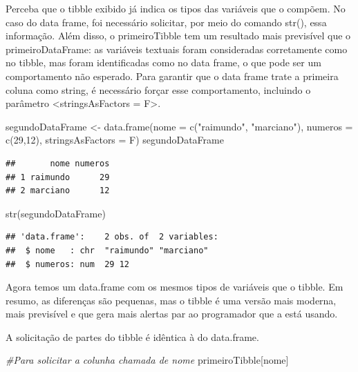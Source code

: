 \documentclass[
]{book}
\newenvironment{Shaded}{\begin{snugshade}}{\end{snugshade}}
\newcommand{\AttributeTok}[1]{\textcolor[rgb]{0.77,0.63,0.00}{#1}}
\newcommand{\CommentTok}[1]{\textcolor[rgb]{0.56,0.35,0.01}{\textit{#1}}}
\newcommand{\DecValTok}[1]{\textcolor[rgb]{0.00,0.00,0.81}{#1}}
\newcommand{\FunctionTok}[1]{\textcolor[rgb]{0.00,0.00,0.00}{#1}}
\newcommand{\NormalTok}[1]{#1}
\newcommand{\OtherTok}[1]{\textcolor[rgb]{0.56,0.35,0.01}{#1}}
\newcommand{\StringTok}[1]{\textcolor[rgb]{0.31,0.60,0.02}{#1}}
\begin{document}
Perceba que o tibble exibido já indica os tipos das variáveis que o compõem. No caso do data frame, foi necessário solicitar, por meio do comando str(), essa informação. Além disso, o primeiroTibble tem um resultado mais previsível que o primeiroDataFrame: as variáveis textuais foram consideradas corretamente como no tibble, mas foram identificadas como no data frame, o que pode ser um comportamento não esperado. Para garantir que o data frame trate a primeira coluna como string, é necessário forçar esse comportamento, incluindo o parâmetro \textless stringsAsFactors = F\textgreater.

\begin{Shaded}
\begin{Highlighting}[]
\NormalTok{segundoDataFrame }\OtherTok{\textless{}{-}} \FunctionTok{data.frame}\NormalTok{(}\AttributeTok{nome =} \FunctionTok{c}\NormalTok{(}\StringTok{"raimundo"}\NormalTok{, }\StringTok{"marciano"}\NormalTok{), }
                      \AttributeTok{numeros =} \FunctionTok{c}\NormalTok{(}\DecValTok{29}\NormalTok{,}\DecValTok{12}\NormalTok{), }\AttributeTok{stringsAsFactors =}\NormalTok{ F)}
\NormalTok{segundoDataFrame}
\end{Highlighting}
\end{Shaded}

\begin{verbatim}
##       nome numeros
## 1 raimundo      29
## 2 marciano      12
\end{verbatim}

\begin{Shaded}
\begin{Highlighting}[]
\FunctionTok{str}\NormalTok{(segundoDataFrame)}
\end{Highlighting}
\end{Shaded}

\begin{verbatim}
## 'data.frame':    2 obs. of  2 variables:
##  $ nome   : chr  "raimundo" "marciano"
##  $ numeros: num  29 12
\end{verbatim}

Agora temos um data.frame com os mesmos tipos de variáveis que o tibble. Em resumo, as diferenças são pequenas, mas o tibble é uma versão mais moderna, mais previsível e que gera mais alertas par ao programador que a está usando.

A solicitação de partes do tibble é idêntica à do data.frame.

\begin{Shaded}
\begin{Highlighting}[]
\CommentTok{\#Para solicitar a colunha chamada de \textquotesingle{}nome\textquotesingle{}}
\NormalTok{primeiroTibble[}\StringTok{\textquotesingle{}nome\textquotesingle{}}\NormalTok{]}
\end{Highlighting}
\end{Shaded}
\end{document}
